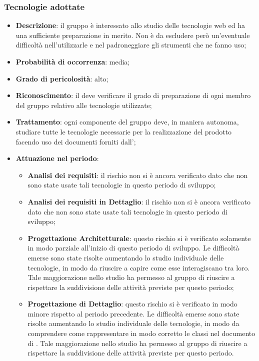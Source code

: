 		\subsubsection{Tecnologie adottate}
		\begin{itemize}
			\item \textbf{Descrizione}: il gruppo è interessato allo studio delle tecnologie web ed ha una sufficiente preparazione in merito. Non è da escludere però un'eventuale difficoltà nell'utilizzarle e nel padroneggiare gli strumenti che ne fanno uso;
			\item \textbf{Probabilità di occorrenza}: media;
			\item \textbf{Grado di pericolosità}: alto;
			\item \textbf{Riconoscimento}: il \textit{\Res} deve verificare il grado di preparazione di ogni membro del gruppo relativo alle tecnologie utilizzate;	
			\item \textbf{Trattamento}: ogni componente del gruppo deve, in maniera autonoma, studiare tutte le tecnologie necessarie per la realizzazione del prodotto facendo uso dei documenti forniti dall'\textit{\Amm};
			\item \textbf{Attuazione nel periodo}:
				\begin{itemize}
					\item \textbf{Analisi dei requisiti}: il rischio non si è ancora verificato dato che non sono state usate tali tecnologie in questo periodo di sviluppo;
					\item \textbf{Analisi dei requisiti in Dettaglio}: il rischio non si è ancora verificato dato che non sono state usate tali tecnologie in questo periodo di sviluppo;
					\item \textbf{Progettazione Architetturale}: questo rischio si è verificato solamente in modo parziale all'inizio di questo periodo di sviluppo. Le difficoltà emerse sono state risolte aumentando lo studio individuale delle tecnologie, in modo da riuscire a capire come esse interagiscano tra loro. Tale maggiorazione nello studio ha permesso al gruppo di riuscire a rispettare la suddivisione delle attività previste per questo periodo; 
					\item \textbf{Progettazione di Dettaglio}: questo rischio si è verificato in modo minore rispetto al periodo precedente. Le difficoltà emerse sono state risolte aumentando lo studio individuale delle tecnologie, in modo da comprendere come rappresentare in modo corretto le classi nel documento di \DdPv. Tale maggiorazione nello studio ha permesso al gruppo di riuscire a rispettare la suddivisione delle attività previste per questo periodo. 
				\end{itemize}
		\end{itemize}
		
